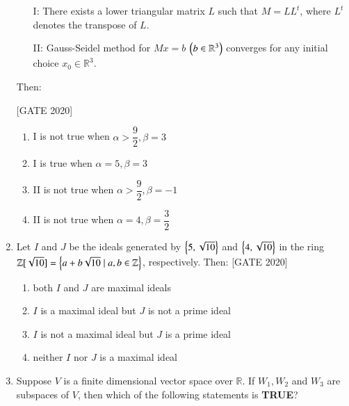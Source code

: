 \documentclass[journal,12pt,onecolumn]{IEEEtran}
\theoremstyle{remark}
\begin{document}
\begin{enumerate}
    \begin{enumerate}
        \item[I:] There exists a lower triangular matrix $ L $ such that $ M = L L^t $, where $ L^t $ denotes the transpose of $ L $.
        \item[II:] Gauss-Seidel method for $ Mx = b $ $\left( b \in \mathbb{R}^3 \right)$ converges for any initial choice $ x_0 \in \mathbb{R}^3 $.
    \end{enumerate}
    Then:
    
    \hfill{[GATE 2020]}
    \begin{multicols}{2}
    \begin{enumerate}
        \item I is not true when $ \alpha > \dfrac{9}{2}, \beta = 3 $
        
        \item I is true when $ \alpha = 5, \beta = 3 $
        \item II is not true when $ \alpha > \dfrac{9}{2}, \beta = -1 $
        \item II is not true when $ \alpha = 4, \beta = \dfrac{3}{2} $
        
    \end{enumerate}
    \end{multicols}

    \item    Let $ I $ and $ J $ be the ideals generated by $ \left\{5, \sqrt{10}\right\} $ and $ \left\{4, \sqrt{10}\right\} $ in the ring $ \mathbb{Z}[\sqrt{10}] = \left\{a + b\sqrt{10} \mid a, b \in \mathbb{Z}\right\} $, respectively. Then:
        \hfill{[GATE 2020]}\begin{multicols}{2}\begin{enumerate}
        \item both $ I $ and $ J $ are maximal ideals
        \item $ I $ is a maximal ideal but $ J $ is not a prime ideal
        \item $ I $ is not a maximal ideal but $ J $ is a prime ideal
        \item neither $ I $ nor $ J $ is a maximal ideal
    \end{enumerate}\end{multicols}
   

    \item   Suppose $ V $ is a finite dimensional vector space over $ \mathbb{R} $. If $ W_1, W_2 $ and $ W_3 $ are subspaces of $ V $, then which of the following statements is \textbf{TRUE}?
   

\end{enumerate}
\end{document}
